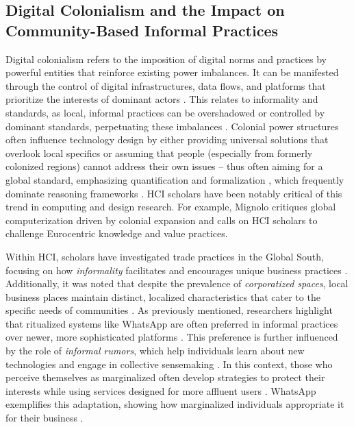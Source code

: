 \subsection{Digital Colonialism and the Impact on Community-Based Informal Practices}

Digital colonialism refers to the imposition of digital norms and practices by powerful entities that reinforce existing power imbalances. It can be manifested through the control of digital infrastructures, data flows, and platforms that prioritize the interests of dominant actors \cite{mohamed2020decolonial}. This relates to informality and standards, as local, informal practices can be overshadowed or controlled by dominant standards, perpetuating these imbalances \cite{adamu2023no}. Colonial power structures often influence technology design by either providing universal solutions that overlook local specifics or assuming that people (especially from formerly colonized regions) cannot address their own issues \cite{10.1145/3544548.3581538, Couldry2021}-- thus often aiming for a global standard, emphasizing quantification and formalization \cite{lampland2009standards}, which frequently dominate reasoning frameworks \cite{pohawpatchoko2018cultural, cutajar2008knowledge}. HCI scholars have been notably critical of this trend in computing and design research. For example, Mignolo \cite{Mason2020} critiques global computerization driven by colonial expansion and calls on HCI scholars to challenge Eurocentric knowledge and value practices.



Within HCI, scholars have investigated trade practices in the Global South, focusing on how \textit{informality} facilitates and encourages unique business practices \cite{10.1145/3025453.3025643}. Additionally, it was noted that despite the prevalence of \textit{corporatized spaces}, local business places maintain distinct, localized characteristics that cater to the specific needs of communities \cite{10.1145/3025453.3025970}. As previously mentioned, researchers highlight that ritualized systems like WhatsApp are often preferred in informal practices over newer, more sophisticated platforms \cite{Cyr2008, 10.1145/3476057, 10.1145/3361116}. This preference is further influenced by the role of \textit{informal rumors}, which help individuals learn about new technologies and engage in collective sensemaking \cite{10.1145/3290605.3300563}. In this context, those who perceive themselves as marginalized often develop strategies to protect their interests while using services designed for more affluent users \cite{10.1145/3460112.3471961}. WhatsApp exemplifies this adaptation, showing how marginalized individuals appropriate it for their business \cite{10.1145/3613905.3651034}. 

